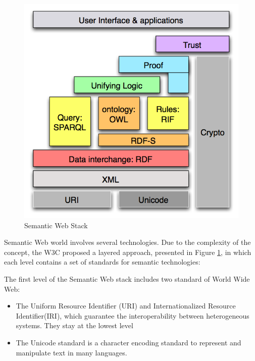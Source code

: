 \begin{figure}[tbh]
  \centering
	\includegraphics[width=0.75\linewidth]{images/semantic_web_stack}
	\caption{Semantic Web Stack} 
  	\label{fig:semantic-web-stack}
\end{figure}
 

Semantic Web world involves several technologies. Due to the complexity of the concept, the W3C proposed a layered approach, presented in Figure \ref{fig:semantic-web-stack}, in which each level contains a set of standards for semantic technologies:

The first level of the Semantic Web stack includes  two standard of World Wide Web:
\begin{itemize}
\item  The Uniform Resource Identifier (URI)  and Internationalized Resource Identifier(IRI), which guarantee the interoperability between heterogeneous systems. They stay at the lowest level
\item  The Unicode standard is a character encoding standard to represent and manipulate text in many languages.
\end{itemize}

